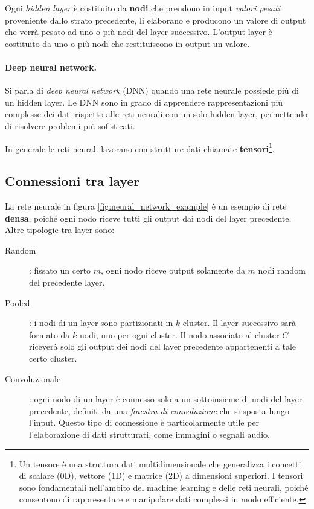 Ogni \emph{hidden layer} è costituito da \textbf{nodi} che prendono in input \emph{valori pesati} proveniente dallo strato precedente, li elaborano e producono un valore di output che verrà pesato ad uno o più nodi del layer successivo. L'output layer è costituito da uno o più nodi che restituiscono in output un valore.

\paragraph{Deep neural network.}
Si parla di \emph{deep neural network} (DNN) quando una rete neurale possiede più di un hidden layer. Le DNN sono in grado di apprendere rappresentazioni più complesse dei dati rispetto alle reti neurali con un solo hidden layer, permettendo di risolvere problemi più sofisticati.

In generale le reti neurali lavorano con strutture dati chiamate \textbf{tensori}\footnote{Un tensore è una struttura dati multidimensionale che generalizza i concetti di scalare (0D), vettore (1D) e matrice (2D) a dimensioni superiori. I tensori sono fondamentali nell'ambito del machine learning e delle reti neurali, poiché consentono di rappresentare e manipolare dati complessi in modo efficiente.}.

\subsection{Connessioni tra layer}
La rete neurale in figura \ref{fig:neural_network_example} è un esempio di rete \textbf{densa}, poiché ogni nodo riceve tutti gli output dai nodi del layer precedente. Altre tipologie tra layer sono:
\begin{description}
    \item[Random]: fissato un certo $m$, ogni nodo riceve output solamente da $m$ nodi random del precedente layer.
    \item[Pooled]: i nodi di un layer sono partizionati in $k$ cluster. Il layer successivo sarà formato da $k$ nodi, uno per ogni cluster. Il nodo associato al cluster $C$ riceverà solo gli output dei nodi del layer precedente appartenenti a tale certo cluster.
    \item[Convoluzionale]: ogni nodo di un layer è connesso solo a un sottoinsieme di nodi del layer precedente, definiti da una \emph{finestra di convoluzione} che si sposta lungo l'input. Questo tipo di connessione è particolarmente utile per l'elaborazione di dati strutturati, come immagini o segnali audio.
\end{description}

